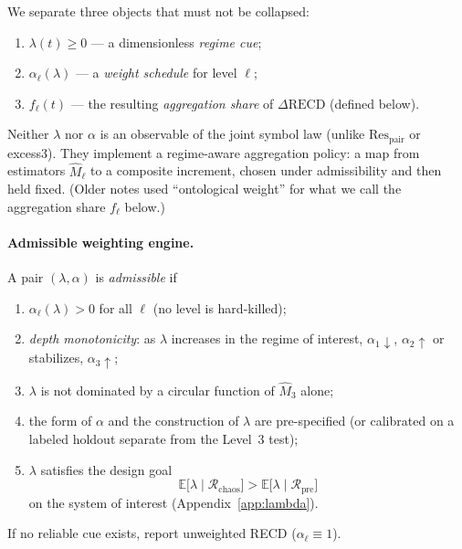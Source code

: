 \documentclass[11pt,a4paper]{article}
\begin{document}
We separate three objects that must not be collapsed:
\begin{enumerate}[leftmargin=*,itemsep=2pt]
  \item $\lambda(t)\ge 0$ --- a dimensionless \emph{regime cue};
  \item $\alpha_\ell(\lambda)$ --- a \emph{weight schedule} for level
  $\ell$;
  \item $f_\ell(t)$ --- the resulting \emph{aggregation share} of
  $\Delta\mathrm{RECD}$ (defined below).
\end{enumerate}
Neither $\lambda$ nor $\alpha$ is an observable of the joint symbol law
(unlike $\mathrm{Res}_{\mathrm{pair}}$ or excess3). They implement a
regime-aware aggregation policy: a map from estimators $\widehat{M}_\ell$
to a composite increment, chosen under admissibility and then held fixed.
(Older notes used ``ontological weight'' for what we call the
aggregation share $f_\ell$ below.)

\paragraph{Admissible weighting engine.}
A pair $(\lambda,\alpha)$ is \emph{admissible} if
\begin{enumerate}[leftmargin=*,itemsep=1pt]
  \item $\alpha_\ell(\lambda)>0$ for all $\ell$ (no level is hard-killed);
  \item \emph{depth monotonicity}: as $\lambda$ increases in the regime
  of interest, $\alpha_1\downarrow$, $\alpha_2\uparrow$ or stabilizes,
  $\alpha_3\uparrow$;
  \item $\lambda$ is not dominated by a circular function of
  $\widehat{M}_3$ alone;
  \item the form of $\alpha$ and the construction of $\lambda$ are
  pre-specified (or calibrated on a labeled holdout separate from the
  Level~3 test);
  \item $\lambda$ satisfies the design goal
  \begin{equation}
  \label{eq:lambda-goal-main}
  \mathbb{E}\bigl[\lambda\mid\mathcal{R}_{\mathrm{chaos}}\bigr]
  >
  \mathbb{E}\bigl[\lambda\mid\mathcal{R}_{\mathrm{pre}}\bigr]
  \end{equation}
  on the system of interest (Appendix~\ref{app:lambda}).
\end{enumerate}
If no reliable cue exists, report unweighted RECD ($\alpha_\ell\equiv 1$).
\end{document}
